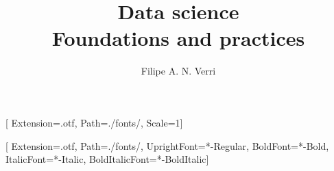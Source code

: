 \documentclass[twoside,a5paper]{book}
\begin{document}
[
  Extension={.otf},
  Path={./fonts/},
  Scale=1]

\setmainfont{STIXTwoText}[
  Extension={.otf},
  Path={./fonts/},
  UprightFont={*-Regular},
  BoldFont={*-Bold},
  ItalicFont={*-Italic},
  BoldItalicFont={*-BoldItalic}]

\title{\sc Data science \\ \large Foundations and practices}
\author{Filipe A. N. Verri}

\maketitle

\tableofcontents









\printbibliography
\end{document}
